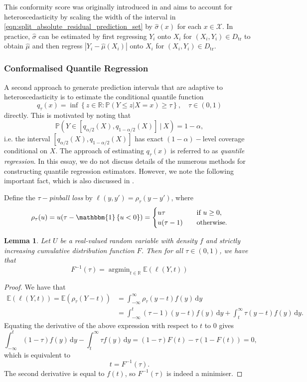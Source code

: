 \documentclass[11pt, titlepage]{article} %
\DeclareMathOperator*{\argmin}{argmin}
\newcommand{\R}{\mathrm}
\newcommand{\Prob}[1]{\mathbb{P}\left( #1 \right)}
\newcommand{\Exp}[3]{\mathbb{E}\left#2 #1 \right#3}
\newcommand{\Ind}[1]{\mathbbm{1}\left\{ #1 \right\}}
\numberwithin{equation}{section}
\newtheorem{lemma}{Lemma}
\theoremstyle{definition}
\numberwithin{theorem}{section}
\numberwithin{lemma}{section}
\numberwithin{corollary}{section}
\numberwithin{proposition}{section}
\numberwithin{definition}{section}
\numberwithin{remark}{section}
\begin{document}
\noindent
This conformity score was originally introduced in \cite{lei2018} and aims to account for heteroscedasticity by scaling the width of the interval in \eqref{eqn:split_absolute_residual_prediction_set} by \(\hat{\sigma}(x)\) for each \(x \in \mathcal{X}\). In practice, \(\hat{\sigma}\) can be estimated by first regressing \(Y_i\) onto \(X_i\) for \((X_i, Y_i) \in D_\R{tr}\) to obtain \(\hat{\mu}\) and then regress \(|Y_i -\hat{\mu}(X_i)|\) onto \(X_i\) for \((X_i, Y_i) \in D_\R{tr}\).

\subsubsection{Conformalised Quantile Regression}

A second approach to generate prediction intervals that are adaptive to heteroscedasticity is to estimate the conditional quantile function \[
    q_{\tau}(x) = \inf \left\{ z \in \mathbb{R}: \Prob{Y \leq z | X = x} \geq \tau \right\}, \quad \tau \in (0,1)
\] directly. This is motivated by noting that \[\Prob{Y \in [q_{\alpha/2}(X), q_{1-\alpha/2}(X)] \ | \  X} = 1-\alpha,\] i.e. the interval \([q_{\alpha/2}(X), q_{1-\alpha/2}(X)]\) has exact \((1-\alpha)-\)level coverage conditional on \(X\). The approach of estimating \(q_\tau(x)\) is referred to as \textit{quantile regression}. In this essay, we do not discuss details of the numerous methods for constructing quantile regression estimators. However, we note the following important fact, which is also discussed in \cite{koenker2005quantile}. \vskip5pt

\noindent
Define the \(\tau-\)\textit{pinball loss} by \(\ell(y, y') = \rho_\tau(y - y')\), where \[\rho_\tau(u) = u(\tau - \Ind{u < 0} ) = \begin{cases}
    u\tau &\quad \text{if } u \geq 0, \\
    u(\tau - 1) &\quad \text{otherwise.}
\end{cases}\]

\begin{lemma}
    Let \(U\) be a real-valued random variable with density \(f\) and strictly increasing cumulative distribution function \(F\). Then for all \(\tau \in (0,1)\), we have that \[F^{-1}(\tau) = \argmin_{t \in \mathbb{R}} \Exp{\ell(Y,t)}{(}{)}\] 
\end{lemma}
\begin{proof}
    We have that \begin{align*}
        \Exp{\ell(Y,t)}{(}{)} = \Exp{\rho_\tau(Y-t)}{(}{)} &= \int_{-\infty}^\infty \rho_\tau(y-t) f(y) \, \R{d}y \\
        &= \int_{-\infty}^t (\tau-1) (y-t) f(y) \, \R{d}y + \int_t^\infty \tau(y-t) f(y) \, \R{d}y.
    \end{align*}
    Equating the derivative of the above expression with respect to \(t\) to \(0\) gives \[\int_{-\infty}^t (1-\tau) f(y) \, \R{d}y - \int_t^\infty \tau f(y) \, \R{d}y = (1-\tau)F(t) - \tau(1-F(t))  =  0,\] which is equivalent to \[t = F^{-1}(\tau).\] The second derivative is equal to \(f(t)\), so \(F^{-1}(\tau)\) is indeed a minimiser.
\end{proof}
\end{document}
